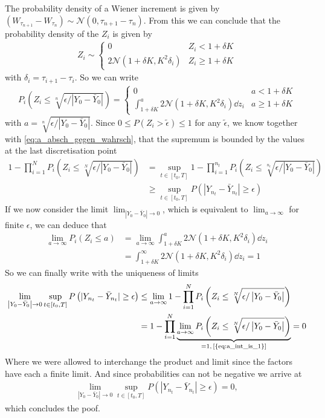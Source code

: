 The probability density of a Wiener increment is given by $\left(W_{\tau_{n+1}} - W_{\tau_n}\right) \sim  \mathcal{N}(0,\tau_{n+1}-\tau_n)$. From this we can conclude that the probability density of the $Z_i$ is given by 
\begin{align}
Z_i \sim \begin{cases} 
      0 & Z_i< 1+\delta K \\
      2 \mathcal{N}(1+\delta K,K^2 \delta_i) &  Z_i\geq 1+\delta K
   \end{cases}
\end{align}
with $\delta_i = \tau_{i+1}-\tau_i$. So we can write
\begin{align}
P_i\left(Z_i\leq \sqrt[n]{ \epsilon/\left|Y_0-\bar{Y}_0\right|}\right) =
 \begin{cases} 
      0 & a< 1+\delta K \\
      \int_{1+\delta K}^{a} 2 \mathcal{N}(1+\delta K,K^2 \delta_i) \dd z_i & a\geq 1+\delta K
   \end{cases}
\end{align}
with $a=\sqrt[n]{\epsilon/\left|Y_0-\bar{Y}_0\right| }$.
Since $0\leq P(Z_i>\tilde{\epsilon})\leq 1$ for any $\tilde{\epsilon}$, we know together with \cref{eq:a_absch_gegen_wahrsch}, that the supremum is bounded by the values at the last discretisation point
\begin{align}
1 - \prod_{i=1}^N P_i\left(Z_i\leq \sqrt[N]{ \epsilon/\left|Y_0-\bar{Y}_0\right|}\right) &= \sup_{t\in[t_0,T]}  1 - \prod_{i=1}^{n_t} P_i\left(Z_i\leq \sqrt[n_t]{ \epsilon/\left|Y_0-\bar{Y}_0\right|}\right) \\ &\geq\sup_{t\in[t_0,T]} P\left(|Y_{n_t}-\bar{Y}_{n_t}|\geq \epsilon\right)
\end{align}
If we now consider the limit $\lim_{\left|Y_0-\bar{Y}_0\right| \rightarrow 0}$, which is equivalent to $\lim_{a\rightarrow \infty}$ for finite $\epsilon$, we can deduce that
\begin{align}
\lim_{a\rightarrow \infty} P_i(Z_i\leq a) &= \lim_{a\rightarrow \infty} \int_{1+\delta K}^{a} 2\mathcal{N}(1+\delta K,K^2\delta_i)\dd z_i \\
&= \int_{1+\delta K}^{\infty} 2\mathcal{N}(1+\delta K,K^2\delta_i)\dd z_i =1\label{eq:a_int_is_1}
\end{align}
So we can finally write with the uniqueness of limits
\begin{align}
\lim_{\left|Y_0-\bar{Y}_0\right| \rightarrow 0} \sup_{t\in[t_0,T]} P\left(|Y_{n_t}-\bar{Y}_{n_t}|\geq \epsilon\right) &\leq \lim_{a\rightarrow \infty} 1 -  \prod_{i=1}^N P_i\left(Z_i\leq \sqrt[N]{ \epsilon/\left|Y_0-\bar{Y}_0\right|}\right)\\
&=1 -  \prod_{i=1}^N \underbrace{\lim_{a\rightarrow \infty} P_i\left(Z_i\leq \sqrt[N]{ \epsilon/\left|Y_0-\bar{Y}_0\right|}\right)}_{=1,\,\text{\cref{{eq:a_int_is_1}}}} = 0
\end{align}
Where we were allowed to interchange the product and limit since the factors have each a finite limit.
And since probabilities can not be negative we arrive at
\begin{align}
\lim_{\left|Y_0-\bar{Y}_0\right| \rightarrow 0} \sup_{t\in[t_0,T]} P\left(|Y_{n_t}-\bar{Y}_{n_t}|\geq \epsilon\right) = 0,
\end{align}
which concludes the poof.